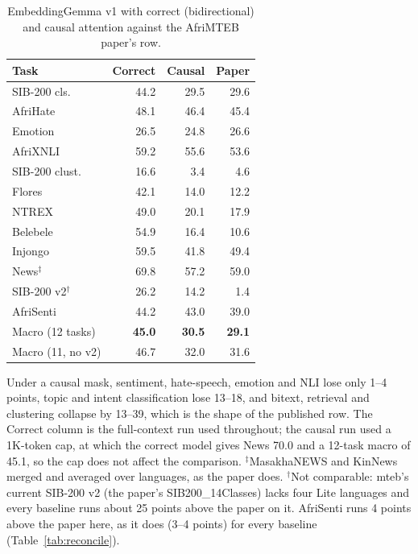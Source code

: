 \documentclass[11pt]{article}
\begin{document}
\begin{table}[t]
  \centering
  \small
  \setlength{\tabcolsep}{4pt}
  
  \begin{tabular}{lrrr}
    \toprule
    Task & Correct & Causal & Paper \\
    \midrule
    SIB-200 cls.   & 44.2 & 29.5 & 29.6 \\
    AfriHate       & 48.1 & 46.4 & 45.4 \\
    Emotion        & 26.5 & 24.8 & 26.6 \\
    AfriXNLI       & 59.2 & 55.6 & 53.6 \\
    SIB-200 clust. & 16.6 &  3.4 &  4.6 \\
    Flores         & 42.1 & 14.0 & 12.2 \\
    NTREX          & 49.0 & 20.1 & 17.9 \\
    Belebele       & 54.9 & 16.4 & 10.6 \\
    Injongo        & 59.5 & 41.8 & 49.4 \\
    News$^\ddagger$ & 69.8 & 57.2 & 59.0 \\
    SIB-200 v2$^\dagger$ & 26.2 & 14.2 & 1.4 \\
    AfriSenti      & 44.2 & 43.0 & 39.0 \\
    \midrule
    Macro (12 tasks) & \textbf{45.0} & \textbf{30.5} & \textbf{29.1} \\
    Macro (11, no v2) & 46.7 & 32.0 & 31.6 \\
    \bottomrule
  \end{tabular}
  \caption{EmbeddingGemma v1 with correct (bidirectional) and causal attention against the AfriMTEB paper's row.}
  \label{tab:causal}
\end{table}

Under a causal mask, sentiment, hate-speech, emotion and NLI lose only 1--4 points, topic and intent classification lose 13--18, and bitext, retrieval and clustering collapse by 13--39, which is the shape of the published row. The Correct column is the full-context run used throughout; the causal run used a 1K-token cap, at which the correct model gives News 70.0 and a 12-task macro of 45.1, so the cap does not affect the comparison. $^\ddagger$MasakhaNEWS and KinNews merged and averaged over
languages, as the paper does. $^\dagger$Not comparable: mteb's current
SIB-200 v2 (the paper's SIB200\_14Classes) lacks four Lite languages and every baseline runs about 25 points above the paper on it. AfriSenti runs 4 points above the paper here, as it does (3--4 points) for every baseline (Table~\ref{tab:reconcile}).
\end{document}
